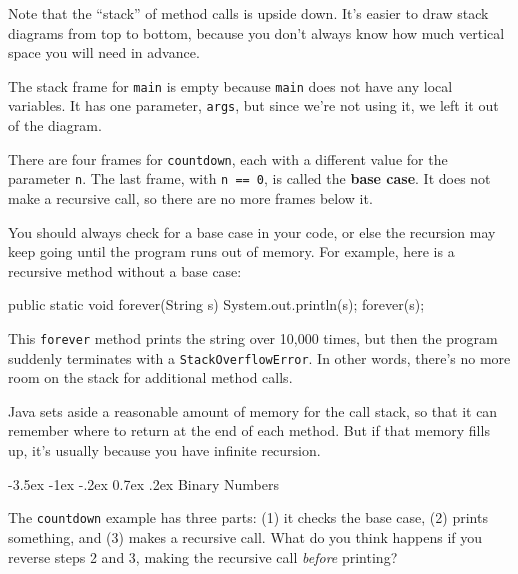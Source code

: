\documentclass[12pt]{book}
\makeatletter
\renewcommand{\section}{\@startsection {section}{1}{\z@}%
    {-3.5ex \@plus -1ex \@minus -.2ex}%
    {0.7ex \@plus.2ex}%
    {\normalfont\Large\bfseries}}
\theoremstyle{exercise}
\newcommand{\java}[1]{\lstinline{#1}} %
\makeatother
\begin{document}
Note that the ``stack'' of method calls is upside down.
It's easier to draw stack diagrams from top to bottom, because you don't always know how much vertical space you will need in advance.

The stack frame for \java{main} is empty because \java{main} does not have any local variables.
It has one parameter, \java{args}, but since we're not using it, we left it out of the diagram.

There are four frames for \java{countdown}, each with a different value for the parameter \java{n}.
The last frame, with \java{n == 0}, is called the {\bf base case}.
It does not make a recursive call, so there are no more frames below it.

You should always check for a base case in your code, or else the recursion may keep going until the program runs out of memory.
For example, here is a recursive method without a base case:

\begin{code}
    public static void forever(String s) {
        System.out.println(s);
        forever(s); 
    }
\end{code}


This \java{forever} method prints the string over 10,000 times, but then the program suddenly terminates with a \java{StackOverflowError}.
In other words, there's no more room on the stack for additional method calls.

Java sets aside a reasonable amount of memory for the call stack, so that it can remember where to return at the end of each method.
But if that memory fills up, it's usually because you have infinite recursion.



\section{Binary Numbers}

The \java{countdown} example has three parts: (1) it checks the base case, (2) prints something, and (3) makes a recursive call.
What do you think happens if you reverse steps 2 and 3, making the recursive call {\it before} printing?
\end{document}
